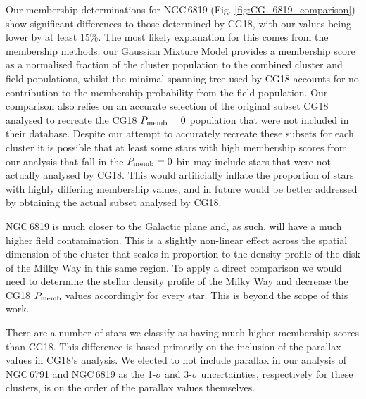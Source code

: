 Our membership determinations for NGC\,6819 (Fig. \ref{fig:CG_6819_comparison}) show significant differences to those determined by CG18, with our values being lower by at least 15\%. The most likely explanation for this comes from the membership methods: our Gaussian Mixture Model provides a membership score as a normalised fraction of the cluster population to the combined cluster and field populations, whilst the minimal spanning tree used by CG18 accounts for no contribution to the membership probability from the field population.  Our comparison also relies on an accurate selection of the original \Gaia{} subset CG18 analysed to recreate the CG18 $P_{\rm memb} = 0$ population that were not included in their database. Despite our attempt to accurately recreate these subsets for each cluster it is possible that at least some stars with high membership scores from our analysis that fall in the $P_{\rm memb} = 0$ bin may include stars that were not actually analysed by CG18. This would artificially inflate the proportion of stars with highly differing membership values, and in future would be better addressed by obtaining the actual subset analysed by CG18.

NGC\,6819 is much closer to the Galactic plane and, as such, will have a much higher field contamination. This is a slightly non-linear effect across the spatial dimension of the cluster that scales in proportion to the density profile of the disk of the Milky Way in this same region. To apply a direct comparison we would need to determine the stellar density profile of the Milky Way and decrease the CG18 $P_{\rm memb}$ values accordingly for every star. This is beyond the scope of this work.

There are a number of stars we classify as having much higher membership scores than CG18. This difference is based primarily on the inclusion of the parallax values in CG18's analysis. We elected to not include parallax in our analysis of NGC\,6791 and NGC\,6819 as the 1-$\sigma$ and 3-$\sigma$ uncertainties, respectively for these clusters, is on the order of the parallax values themselves.


